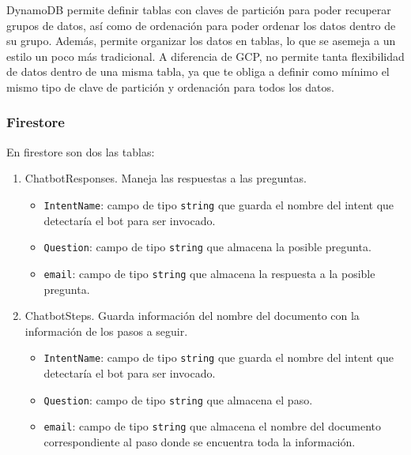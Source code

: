 DynamoDB permite definir tablas con claves de partición para poder recuperar grupos de datos, así como de ordenación para poder ordenar los datos dentro de su grupo. Además, permite organizar los datos en tablas, lo que se asemeja a un estilo un poco más tradicional. A diferencia de GCP, no permite tanta flexibilidad de datos dentro de una misma tabla, ya que te obliga a definir como mínimo el mismo tipo de clave de partición y ordenación para todos los datos.

\subsubsection{Firestore}
En firestore son dos las tablas:
\begin{enumerate}
    \item ChatbotResponses. Maneja las respuestas a las preguntas.
    \begin{itemize}
        \item \texttt{IntentName}: campo de tipo \texttt{string} que guarda el nombre del intent que detectaría el bot para ser invocado.
        \item \texttt{Question}: campo de tipo \texttt{string} que almacena la posible pregunta.
        \item \texttt{email}: campo de tipo \texttt{string} que almacena la respuesta a la posible pregunta.
    \end{itemize}

    \item ChatbotSteps. Guarda información del nombre del documento con la información de los pasos a seguir.
    \begin{itemize}
        \item \texttt{IntentName}: campo de tipo \texttt{string} que guarda el nombre del intent que detectaría el bot para ser invocado.
        \item \texttt{Question}: campo de tipo \texttt{string} que almacena el paso.
        \item \texttt{email}: campo de tipo \texttt{string} que almacena el nombre del documento correspondiente al paso donde se encuentra toda la información.
    \end{itemize}

\end{enumerate}



